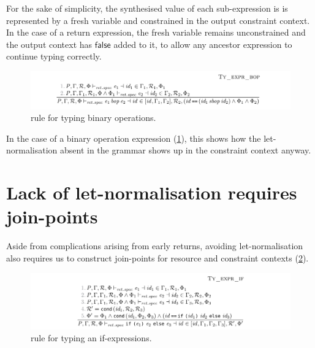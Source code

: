 For the sake of simplicity, the synthesised value of each sub-expression is is
represented by a fresh variable and constrained in the output constraint
context. In the case of a return expression, the fresh variable remains
unconstrained and the output context has $\mathsf{false}$ added to it, to allow
any ancestor expression to continue typing correctly.

\begin{figure}[tpb]
    \ContinuedFloat{}
    \includegraphics{figures/minicn-bop}
    \caption{ rule for typing binary operations.}\label{fig:minicn-bop}
\end{figure}

In the case of a binary operation expression (\cref{fig:minicn-bop}), this
shows how the let-normalisation absent in the grammar shows up in the
constraint context anyway.

\section{Lack of let-normalisation requires join-points}

Aside from complications arising from early returns, avoiding let-normalisation
also requires us to construct join-points for resource and constraint contexts
(\cref{fig:minicn-if}).

\begin{figure}[tpb]
    \ContinuedFloat{}
    \includegraphics{figures/minicn-if}
    \caption{ rule for typing an if-expressions.}\label{fig:minicn-if}
\end{figure}

